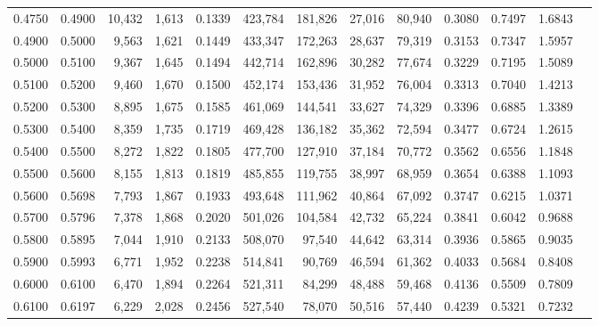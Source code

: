 \begin{tabular}{rrrrrrrrrrrrr}
0.4750 & 0.4900 & 10,432 & 1,613 &                                     0.1339 & 423,784 & 181,826 &  27,016 &  80,940 & 0.3080 & 0.7497 & 1.6843 \\
0.4900 & 0.5000 &  9,563 & 1,621 &                                     0.1449 & 433,347 & 172,263 &  28,637 &  79,319 & 0.3153 & 0.7347 & 1.5957 \\
0.5000 & 0.5100 &  9,367 & 1,645 &                                     0.1494 & 442,714 & 162,896 &  30,282 &  77,674 & 0.3229 & 0.7195 & 1.5089 \\
0.5100 & 0.5200 &  9,460 & 1,670 &                                     0.1500 & 452,174 & 153,436 &  31,952 &  76,004 & 0.3313 & 0.7040 & 1.4213 \\
0.5200 & 0.5300 &  8,895 & 1,675 &                                     0.1585 & 461,069 & 144,541 &  33,627 &  74,329 & 0.3396 & 0.6885 & 1.3389 \\
0.5300 & 0.5400 &  8,359 & 1,735 &                                     0.1719 & 469,428 & 136,182 &  35,362 &  72,594 & 0.3477 & 0.6724 & 1.2615 \\
0.5400 & 0.5500 &  8,272 & 1,822 &                                     0.1805 & 477,700 & 127,910 &  37,184 &  70,772 & 0.3562 & 0.6556 & 1.1848 \\
0.5500 & 0.5600 &  8,155 & 1,813 &                                     0.1819 & 485,855 & 119,755 &  38,997 &  68,959 & 0.3654 & 0.6388 & 1.1093 \\
0.5600 & 0.5698 &  7,793 & 1,867 &                                     0.1933 & 493,648 & 111,962 &  40,864 &  67,092 & 0.3747 & 0.6215 & 1.0371 \\
0.5700 & 0.5796 &  7,378 & 1,868 &                                     0.2020 & 501,026 & 104,584 &  42,732 &  65,224 & 0.3841 & 0.6042 & 0.9688 \\
0.5800 & 0.5895 &  7,044 & 1,910 &                                     0.2133 & 508,070 &  97,540 &  44,642 &  63,314 & 0.3936 & 0.5865 & 0.9035 \\
0.5900 & 0.5993 &  6,771 & 1,952 &                                     0.2238 & 514,841 &  90,769 &  46,594 &  61,362 & 0.4033 & 0.5684 & 0.8408 \\
0.6000 & 0.6100 &  6,470 & 1,894 &                                     0.2264 & 521,311 &  84,299 &  48,488 &  59,468 & 0.4136 & 0.5509 & 0.7809 \\
0.6100 & 0.6197 &  6,229 & 2,028 &                                     0.2456 & 527,540 &  78,070 &  50,516 &  57,440 & 0.4239 & 0.5321 & 0.7232 \\

\end{tabular}
